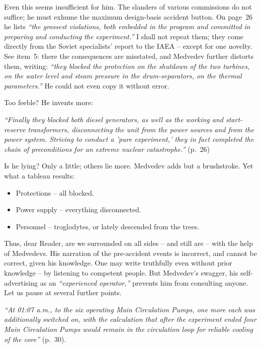 \documentclass[openright]{bookest}
\begin{document}
Even this seems insufficient for him. The slanders of various commissions do not suffice; he must exhume the maximum design-basis accident button. On page~26 he lists \textit{``the grossest violations, both embedded in the program and committed in preparing and conducting the experiment.''} I shall not repeat them; they come directly from the Soviet specialists' report to the IAEA -- except for one novelty. See item~5: there the consequences are misstated, and Medvedev further distorts them, writing: \textit{``they blocked the protection on the shutdown of the two turbines, on the water level and steam pressure in the drum-separators, on the thermal parameters.''} He could not even copy it without error.

Too feeble? He invents more:

\begin{personal}
\textit{``Finally they blocked both diesel generators, as well as the working and start-reserve transformers, disconnecting the unit from the power sources and from the power system. Striving to conduct a 'pure experiment,' they in fact completed the chain of preconditions for an extreme nuclear catastrophe.''} (p.~26)
\end{personal}

Is he lying? Only a little; others lie more. Medvedev adds but a brushstroke. Yet what a tableau results:

\begin{itemize}
\item Protections -- all blocked.  
\item Power supply -- everything disconnected.  
\item Personnel -- troglodytes, or lately descended from the trees.
\end{itemize}

Thus, dear Reader, are we surrounded on all sides -- and still are -- with the help of Medvedevs. His narration of the pre-accident events is incorrect, and cannot be correct, given his knowledge. One may write truthfully even without prior knowledge -- by listening to competent people. But Medvedev's swagger, his self-advertising as an \textit{``experienced operator,''} prevents him from consulting anyone. Let us pause at several further points.

\begin{personal}
\textit{``At 01:07 a.m., to the six operating Main Circulation Pumps, one more each was additionally switched on, with the calculation that after the experiment ended four Main Circulation Pumps would remain in the circulation loop for reliable cooling of the core''} (p.~30).
\end{personal}
\end{document}
